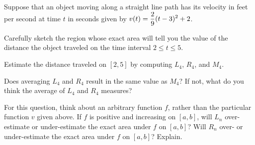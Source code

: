 \begin{activity} \label{A:4.2.2}  Suppose that an object moving along a straight line path has its velocity in feet per second at time $t$ in seconds given by $\displaystyle v(t) = \frac{2}{9}(t-3)^2 + 2$.
\ba
\item Carefully sketch the region whose exact area will tell you the value of the distance the object traveled on the time interval $2 \le t \le 5$.
	
\item Estimate the distance traveled on $[2,5]$ by computing $L_4$, $R_4$, and $M_4$.

\item Does averaging $L_4$ and $R_4$ result in the same value as $M_4$?  If not, what do you think the average of $L_4$ and $R_4$ measures?

\item For this question, think about an arbitrary function $f$, rather than the particular function $v$ given above.  If $f$ is positive and increasing on $[a,b]$, will $L_n$ over-estimate or under-estimate the exact area under $f$ on $[a,b]$?  Will $R_n$ over- or under-estimate the exact area under $f$ on $[a,b]$? Explain.
\ea
\end{activity}

